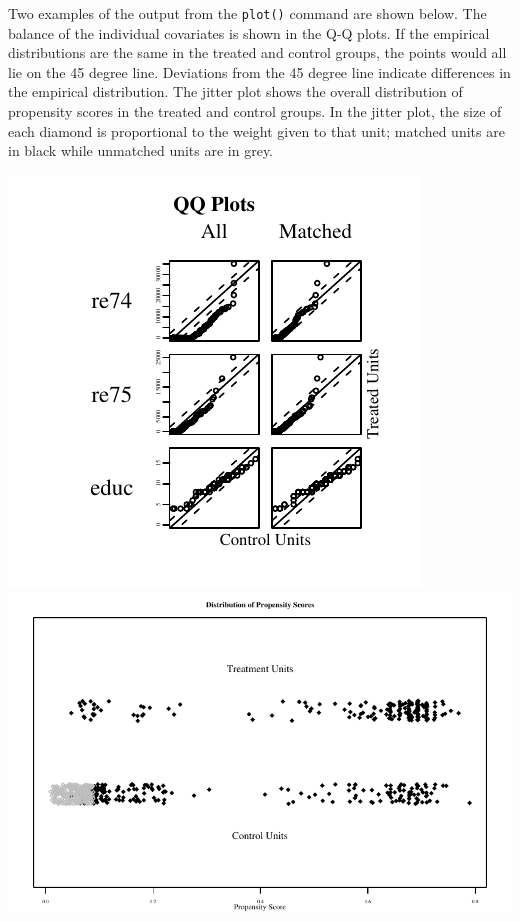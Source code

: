 
Two examples of the output from the {\tt plot()} command are shown
below.
The balance of the individual covariates is shown in the Q-Q plots.
If the empirical distributions are the same in the treated and control
groups, the points would all lie on the 45 degree line.  Deviations
from the 45 degree line indicate differences in the empirical
distribution.  The jitter plot shows the overall distribution of
propensity scores in the treated and control groups.  In the jitter
plot, the size of each diamond is proportional to the weight given to
that unit; matched units are in black while unmatched units are in
grey.

\includegraphics{figs/qqplotnn1}
\includegraphics{figs/jitterplotnn}


